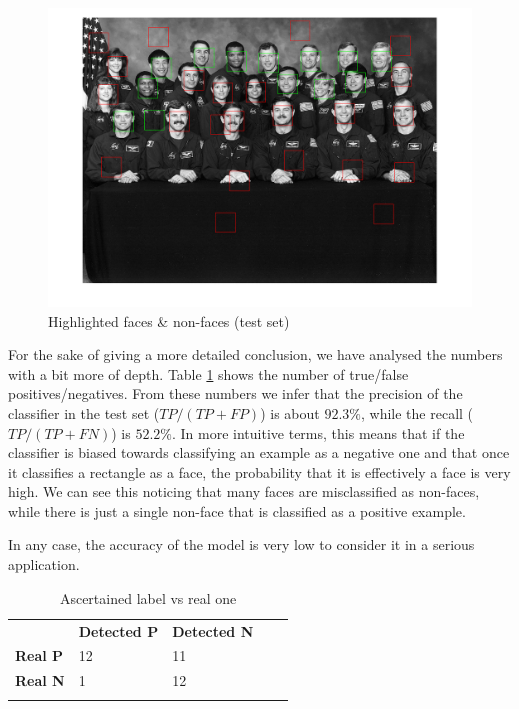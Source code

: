 \begin{figure}[h!tb]
	\centering
		\includegraphics[width=\textwidth]{./img/ex1/testfaceshighlighted.png}
	\caption{Highlighted faces \& non-faces (test set)}
	\label{fig:testfaceshighlighted}
\end{figure}

For the sake of giving a more detailed conclusion, we have analysed the numbers with a bit more of depth. Table \ref{tab:comparisonrealdetected} shows the number of true/false positives/negatives. From these numbers we infer that the precision of the classifier in the test set ($ TP / ( TP + FP ) $) is about $ 92.3 \% $, while the recall ($ TP / ( TP + FN ) $) is $ 52.2 \% $. In more intuitive terms, this means that if the classifier is biased towards classifying an example as a negative one and that once it classifies a rectangle as a face, the probability that it is effectively a face is very high. We can see this noticing that many faces are misclassified as non-faces, while there is just a single non-face that is classified as a positive example.

In any case, the accuracy of the model is very low to consider it in a serious application.

\begin{table}[]
	\centering
	\begin{tabular}{lllll}
		           & \textbf{Detected P} & \textbf{Detected N} &  &  \\
		\textbf{Real P} & 12         & 11         &  &  \\
		\textbf{Real N} & 1          & 12         &  &  \\
	           &            &            &  & 
	\end{tabular}
	\caption{Ascertained label vs real one}
	\label{tab:comparisonrealdetected}
\end{table}

